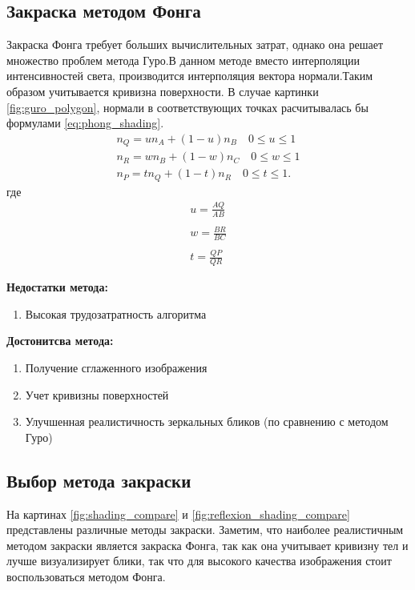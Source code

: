 \documentclass[a4paper,14pt, unknownkeysallowed]{extreport}
\begin{document}
\subsection{Закраска методом Фонга}
Закраска Фонга требует больших вычислительных затрат, однако она решает множество проблем метода Гуро.В данном методе вместо интерполяции интенсивностей света,
производится интерполяция вектора нормали.Таким образом учитывается кривизна поверхности.
В случае картинки \ref{fig:guro_polygon}, нормали в соответствующих точках расчитывалась бы формулами \ref{eq:phong_shading}. \cite{Rodgers}
\begin{equation}
	\label{eq:phong_shading}
	\begin{aligned}
	n_Q = un_A + (1-u)n_B  \quad 0 \leq u \leq 1 \\
	n_R = wn_B + (1-w)n_C  \quad 0 \leq w \leq 1 \\
	n_P = tn_Q + (1-t)n_R  \quad 0 \leq t \leq 1.
	\end{aligned}
\end{equation}
где
\begin{equation}
	\begin{aligned}
	u = \frac{AQ}{AB} \\\\
	w = \frac{BR}{BC} \\\\
	t = \frac{QP}{QR} 
	\end{aligned}
\end{equation}

\textbf{Недостатки метода:}
\begin{enumerate} 
	\item Высокая трудозатратность алгоритма
\end{enumerate}

\textbf{Достонитсва метода:}
\begin{enumerate}
	\item Получение сглаженного изображения
	\item Учет кривизны поверхностей
	\item Улучшенная реалистичность зеркальных бликов (по сравнению с методом Гуро)
\end{enumerate}


\subsection{Выбор метода закраски}
На картинах  \ref{fig:shading_compare} и \ref{fig:reflexion_shading_compare} представлены различные методы закраски. Заметим, что наиболее реалистичным методом закраски является
закраска Фонга, так как она учитывает кривизну тел и лучше визуализирует блики, так что для высокого качества изображения стоит воспользоваться методом Фонга.
\end{document}
